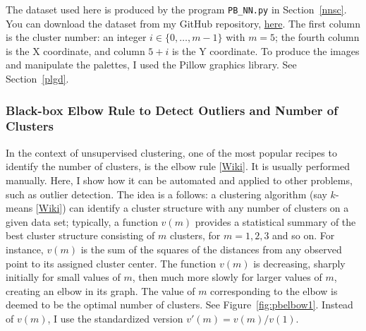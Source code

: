 \documentclass[10pt]{article}
\begin{document}
The dataset used here is produced by the program \texttt{PB\_NN.py} in Section~\ref{nnsc}. You can download the dataset from my
GitHub repository, \href{https://github.com/VincentGranville/Point-Processes/blob/main/Data/PB_NN.txt}{here}. The first column is
the cluster number: an integer $i\in\{0,\dots,m-1\}$ with $m=5$; the fourth column is the X coordinate, and column $5+i$ is the Y coordinate. To produce
the images and manipulate the palettes, I used the Pillow graphics library. See
Section~\ref{plgd}.

\subsubsection{Black-box Elbow Rule to Detect Outliers and Number of Clusters}\label{bbcl}

In the context of unsupervised clustering, one of the most popular recipes to identify the number of clusters, is the
\textcolor{index}{elbow rule} [\href{https://en.wikipedia.org/wiki/Elbow_method_(clustering)}{Wiki}]. It is usually performed manually. Here, I show how it can be automated and applied to other problems, such as outlier detection. The idea is a follows: a clustering algorithm (say $k$-means
[\href{https://en.wikipedia.org/wiki/K-means_clustering}{Wiki}]) can identify a cluster structure with any number of clusters on a given data set; typically, a function $v(m)$ provides a statistical summary of the best cluster structure consisting of $m$ clusters, for $m=1,2,3$ and so on. For instance, $v(m)$ is the sum of the squares of the distances from any observed point to its assigned cluster center.
The function $v(m)$ is decreasing, sharply initially for small values of $m$, then much more slowly for larger values of $m$, creating an elbow in its graph.  The value of $m$ corresponding to the elbow is deemed to be the optimal number of clusters. See Figure~\ref{fig:pbelbow1}. Instead of $v(m)$, I use the standardized version $v'(m)=v(m)/v(1)$. \\

\end{document}
